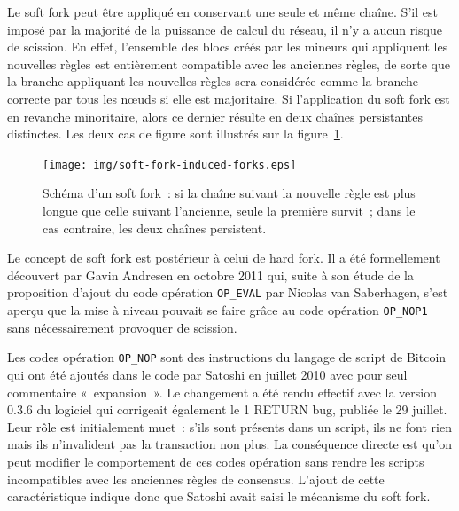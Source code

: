 Le soft fork peut être appliqué en conservant une seule et même chaîne. S'il est imposé par la majorité de la puissance de calcul du réseau, il n'y a aucun risque de scission. En effet, l'ensemble des blocs créés par les mineurs qui appliquent les nouvelles règles est entièrement compatible avec les anciennes règles, de sorte que la branche appliquant les nouvelles règles sera considérée comme la branche correcte par tous les nœuds si elle est majoritaire. Si l'application du soft fork est en revanche minoritaire, alors ce dernier résulte en deux chaînes persistantes distinctes. Les deux cas de figure sont illustrés sur la figure~\ref{fig:soft-fork}.

\begin{figure}[h]
  \centering
  \texttt{[image: img/soft-fork-induced-forks.eps]}
  \caption{Schéma d'un soft fork~: si la chaîne suivant la nouvelle règle est plus longue que celle suivant l'ancienne, seule la première survit~; dans le cas contraire, les deux chaînes persistent.}
  \label{fig:soft-fork}
\end{figure}

Le concept de soft fork est postérieur à celui de hard fork. Il a été formellement découvert par Gavin Andresen en octobre 2011 qui, suite à son étude de la proposition d'ajout du code opération \texttt{OP\_EVAL} par Nicolas van Saberhagen, s'est aperçu que la mise à niveau pouvait se faire grâce au code opération \texttt{OP\_NOP1} sans nécessairement provoquer de scission.

Les codes opération \texttt{OP\_NOP} sont des instructions du langage de script de Bitcoin qui ont été ajoutés dans le code par Satoshi en juillet 2010 avec pour seul commentaire «~expansion~». Le changement a été rendu effectif avec la version 0.3.6 du logiciel qui corrigeait également le 1 RETURN bug, publiée le 29 juillet. Leur rôle est initialement muet~: s'ils sont présents dans un script, ils ne font rien mais ils n'invalident pas la transaction non plus. La conséquence directe est qu'on peut modifier le comportement de ces codes opération sans rendre les scripts incompatibles avec les anciennes règles de consensus. L'ajout de cette caractéristique indique donc que Satoshi avait saisi le mécanisme du soft fork.

